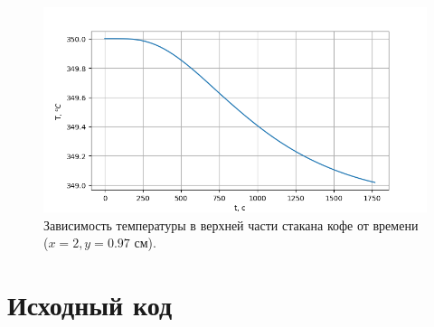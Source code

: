 \begin{figure}[H]
	\center
	\includegraphics[width=.6\linewidth]{imgs_11/temp.png}
	\caption{Зависимость температуры в верхней части стакана кофе от времени ($x=2 , y= 0.97$ см).}
	\label{fig:temp}
\end{figure}

\newpage
\section{Исходный код}




